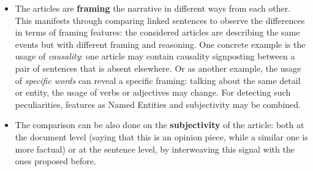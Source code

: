\begin{itemize}
    \item The articles are \textbf{framing} the narrative in different ways from each other. This manifests through comparing linked sentences to observe the differences in terms of framing features: the considered articles are describing the same events but with different framing and reasoning.
    One concrete example is the usage of \emph{causality}: one article may contain causality signposting between a pair of sentences that is absent elsewhere.
    Or as another example, the usage of \emph{specific words} can reveal a specific framing: talking about the same detail or entity, the usage of verbs or adjectives may change.
    For detecting such peculiarities, %
    features as Named Entities and subjectivity may be combined.

    \item The comparison can be also done on the \textbf{subjectivity} of the article: both at the document level (saying that this is an opinion piece, while a similar one is more factual) or at the sentence level, by interweaving this signal with the ones proposed before.

\end{itemize}





